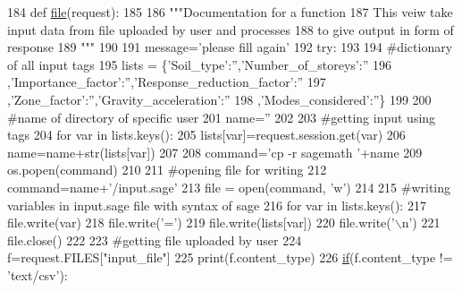 \begin{DoxyCode}
184 \textcolor{keyword}{def }\hyperlink{namespacecivilsage_1_1views_a32de127956738677913352a2db84ecdb}{file}(request):
185 
186     \textcolor{stringliteral}{"""Documentation for a function}
187 \textcolor{stringliteral}{    This veiw take input data from file uploaded by user and processes}
188 \textcolor{stringliteral}{    to give output in form of response}
189 \textcolor{stringliteral}{    """}
190 
191     message=\textcolor{stringliteral}{'please fill again'}
192     \textcolor{keywordflow}{try}:
193 
194         \textcolor{comment}{#dictionary of all input tags}
195         lists = \{\textcolor{stringliteral}{'Soil\_type'}:\textcolor{stringliteral}{''},\textcolor{stringliteral}{'Number\_of\_storeys'}:\textcolor{stringliteral}{''}
196         ,\textcolor{stringliteral}{'Importance\_factor'}:\textcolor{stringliteral}{''},\textcolor{stringliteral}{'Response\_reduction\_factor'}:\textcolor{stringliteral}{''}
197         ,\textcolor{stringliteral}{'Zone\_factor'}:\textcolor{stringliteral}{''},\textcolor{stringliteral}{'Gravity\_acceleration'}:\textcolor{stringliteral}{''}
198         ,\textcolor{stringliteral}{'Modes\_considered'}:\textcolor{stringliteral}{''}\}
199 
200         \textcolor{comment}{#name of directory of specific user}
201         name=\textcolor{stringliteral}{''}
202 
203         \textcolor{comment}{#getting input using tags}
204         \textcolor{keywordflow}{for} var \textcolor{keywordflow}{in} lists.keys():
205             lists[var]=request.session.get(var)
206             name=name+str(lists[var])
207 
208         command=\textcolor{stringliteral}{'cp -r sagemath '}+name
209         os.popen(command)
210 
211         \textcolor{comment}{#opening file for writing}
212         command=name+\textcolor{stringliteral}{'/input.sage'}
213         file = open(command, \textcolor{stringliteral}{'w'})
214 
215         \textcolor{comment}{#writing variables in input.sage file with syntax of sage}
216         \textcolor{keywordflow}{for} var \textcolor{keywordflow}{in} lists.keys():
217             file.write(var)
218             file.write(\textcolor{stringliteral}{'='})
219             file.write(lists[var])
220             file.write(\textcolor{stringliteral}{'\(\backslash\)n'})
221         file.close()
222 
223         \textcolor{comment}{#getting file uploaded by user}
224         f=request.FILES[\textcolor{stringliteral}{"input\_file"}]
225         print(f.content\_type)
226         \hyperlink{bootstrap_8min_8js_ac2d69f5011896c6ed4a54e0dd36f6334}{if}(f.content\_type != \textcolor{stringliteral}{'text/csv'}):

\end{DoxyCode}
